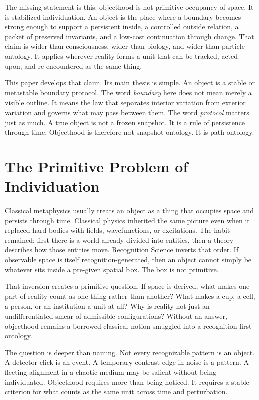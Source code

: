 \documentclass[11pt]{article}
\begin{document}
The missing statement is this: objecthood is not primitive occupancy of space.
It is stabilized individuation.
An object is the place where a boundary becomes strong enough to support a persistent inside, a controlled outside relation, a packet of preserved invariants, and a low-cost continuation through change.
That claim is wider than consciousness, wider than biology, and wider than particle ontology.
It applies wherever reality forms a unit that can be tracked, acted upon, and re-encountered as the same thing.

This paper develops that claim.
Its main thesis is simple.
An object is a stable or metastable boundary protocol.
The word \emph{boundary} here does not mean merely a visible outline.
It means the law that separates interior variation from exterior variation and governs what may pass between them.
The word \emph{protocol} matters just as much.
A true object is not a frozen snapshot.
It is a rule of persistence through time.
Objecthood is therefore not snapshot ontology.
It is path ontology.

\section{The Primitive Problem of Individuation}

Classical metaphysics usually treats an object as a thing that occupies space and persists through time.
Classical physics inherited the same picture even when it replaced hard bodies with fields, wavefunctions, or excitations.
The habit remained: first there is a world already divided into entities, then a theory describes how those entities move.
Recognition Science inverts that order.
If observable space is itself recognition-generated, then an object cannot simply be whatever sits inside a pre-given spatial box.
The box is not primitive.

That inversion creates a primitive question.
If space is derived, what makes one part of reality count as one thing rather than another?
What makes a cup, a cell, a person, or an institution a unit at all?
Why is reality not just an undifferentiated smear of admissible configurations?
Without an answer, objecthood remains a borrowed classical notion smuggled into a recognition-first ontology.

The question is deeper than naming.
Not every recognizable pattern is an object.
A detector click is an event.
A temporary contrast edge in noise is a pattern.
A fleeting alignment in a chaotic medium may be salient without being individuated.
Objecthood requires more than being noticed.
It requires a stable criterion for what counts as the same unit across time and perturbation.
\end{document}
